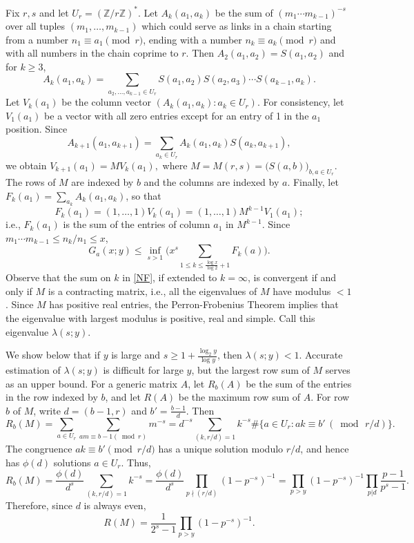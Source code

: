 \documentclass[12pt]{amsart}
\theoremstyle{remark}
\theoremstyle{plain}
\numberwithin{equation}{section}
\newcommand{\ZZ}{{\mathbb Z}}
\newcommand{\be}{\begin{equation}}
\newcommand{\ee}{\end{equation}}
\newcommand{\lam}{\ensuremath{\lambda}}
\renewcommand{\(}{\left(}
\renewcommand{\)}{\right)}
\renewcommand{\le}{\leqslant}
\renewcommand{\ge}{\geqslant}
\begin{document}
Fix $r,s$ and let $U_r = (\ZZ/r\ZZ)^*$.
Let $A_k(a_1,a_k)$ be the sum of $(m_1\cdots m_{k-1})^{-s}$ over all
tuples $(m_1,\ldots,m_{k-1})$ which could serve as links in a chain
starting from
a number $n_1\equiv a_1\pmod{r}$, ending with a number $n_k\equiv
a_k\pmod{r}$ and with all numbers in the chain coprime to $r$.
Then $A_2(a_1,a_2)=S(a_1,a_2)$ and for $k\ge 3$,
$$
A_k(a_1,a_k) = \sum_{a_2,\ldots,a_{k-1}\in U_r} S(a_1,a_2) S(a_2,a_3) \cdots
S(a_{k-1},a_k).
$$
Let $V_k(a_1)$ be the column vector $(A_k(a_1,a_k): a_k\in U_r)$.
For consistency, let $V_1(a_1)$ be a vector with all zero entries
except for an entry of 1 in the $a_1$ position.  Since
$$
A_{k+1}(a_1,a_{k+1}) = \sum_{a_k\in U_r} A_k(a_1,a_k) S(a_k,a_{k+1}),
$$
we obtain $V_{k+1}(a_1) = M V_k(a_1),$
where  $M =  M(r,s) = \bigl( S(a,b) \bigr)_{b,a\in U_r}.$
The rows of $M$ are indexed by $b$ and the columns are indexed by
$a$. Finally, let $F_k(a_1) = \sum_{a_k} A_k(a_1,a_k)$, so that
\[
 F_k(a_1) = (1,\ldots,1) V_k(a_1) = (1,\ldots,1)
M^{k-1} V_1(a_1);
\]
i.e., $F_k(a_1)$ is the sum of the entries of
column $a_1$ in $M^{k-1}$.
Since $m_1\cdots m_{k-1} \le n_k/n_1\le x$,
\be\label{NF}
G_a(x;y) \le \inf_{s>1} \Big(x^s \sum_{1\le k\le \frac{\log x}{\log
2}+1} F_k(a)\Big).
\ee
Observe that the sum on $k$ in \eqref{NF}, if extended to
$k=\infty$, is convergent if and only if $M$ is a contracting
matrix, i.e., all the eigenvalues of $M$ have modulus $<1$.  Since
$M$ has positive real entries, the Perron-Frobenius Theorem implies
that the eigenvalue with largest modulus is positive, real and
simple.  Call this eigenvalue $\lam(s;y)$.

We show below that if $y$ is large and $s\ge 1 + \frac{\log_2 y}{\log y}$,
then $\lam(s;y)<1$.
Accurate estimation of
$\lam(s;y)$ is difficult for large $y$, but the largest row sum
of $M$ serves as an upper bound.  For a generic matrix $A$, let
$R_b(A)$ be the sum of the entries in the row indexed by $b$,
and let $R(A)$ be the maximum row sum of $A$.  For row $b$ of $M$,
write $d=(b-1,r)$ and $b'=\frac{b-1}{d}$.  Then
\begin{equation*}
R_b(M) = \sum_{a\in U_r} \sum_{am\equiv b-1 (\!\bmod{r})} m^{-s} =
d^{-s} \sum_{(k,r/d)=1} k^{-s} \# \{ a\in U_r:ak\equiv b'\,
(\!\bmod{\, r/d}) \}.
\end{equation*}
The congruence $ak \equiv b' \pmod{r/d}$
has a unique solution modulo $r/d$, and hence has
$\phi(d)$ solutions $a\in U_r$.  Thus,
\begin{equation*}
R_b(M)=\frac{\phi(d)}{d^s} \sum_{(k,r/d)=1} k^{-s}  =
\frac{\phi(d)}{d^s} \prod_{p\nmid (r/d)} (1-p^{-s})^{-1} = 
\prod_{p>y}(1-p^{-s})^{-1} \prod_{p|d} \frac{p-1}{p^s-1}.
\end{equation*}
Therefore, since $d$ is always even,
\be\label{RM}
R(M) = \frac{1}{2^s-1} \prod_{p>y} (1-p^{-s})^{-1}.
\ee
\end{document}
